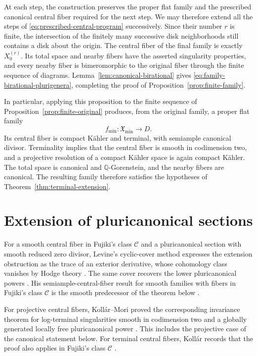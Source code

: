 \documentclass[11pt,a4paper]{article}
\theoremstyle{definition}\newtheorem{definition}[theorem]{Definition}
\theoremstyle{remark}\newtheorem*{remark}{Remark}
\newcommand{\Q}{\mathbb Q}\newcommand{\C}{\mathbb C}
\begin{document}
At each step, the construction preserves the proper flat family
and the prescribed canonical central fiber required for the next
step. We may therefore extend all the steps of
\eqref{eq:prescribed-central-program} successively. Since their
number $r$ is finite, the intersection of the finitely many
successive disk neighborhoods still contains a disk about the
origin. The central fiber of the final family is exactly
$X_0^{(r)}$. Its total space and nearby fibers have the asserted
singularity properties, and every nearby fiber is bimeromorphic
to the original fiber through the finite sequence of diagrams.
Lemma~\ref{lem:canonical-birational} gives
\eqref{eq:family-birational-plurigenera}, completing the proof of
Proposition~\ref{prop:finite-family}.

In particular, applying this proposition to the finite sequence
of Proposition~\ref{prop:finite-original} produces, from the
original family, a proper flat family
\begin{equation}\label{eq:terminal-family-output}
 f_{\min}:\mathfrak X_{\min}\longrightarrow D.
\end{equation}
Its central fiber is compact Kähler and terminal, with semiample
canonical divisor. Terminality implies
that the central fiber is smooth in codimension two, and a
projective resolution of a compact Kähler space is again compact
Kähler. The total space is canonical and $\Q$-Gorenstein, and
the nearby fibers are canonical. The resulting family therefore
satisfies the hypotheses of Theorem~\ref{thm:terminal-extension}.

\section{Extension of pluricanonical sections}\label{sec:terminal-extension}

For a smooth central fiber in Fujiki's class $\mathcal C$ and a
pluricanonical section with smooth reduced zero divisor, Levine's
cyclic-cover method expresses the extension obstruction as the trace
of an exterior derivative, whose
cohomology class vanishes by Hodge theory
\cite[Proposition~1.6]{Levine1983}. The same cover recovers the lower
pluricanonical powers \cite[Corollary~1.8]{Levine1983}.
His semiample-central-fiber result for smooth families with fibers in
Fujiki's class $\mathcal C$ is the smooth predecessor of the theorem
below \cite[Corollary~1.10]{Levine1983}.

For projective central fibers, Kollár--Mori proved the corresponding
invariance theorem for log-terminal singularities smooth in
codimension two and a globally generated locally free pluricanonical power
\cite[Theorem~12.5.5]{KM1992}.
This includes the projective case of the canonical statement below.
For terminal central fibers, Kollár records that the proof also applies
in Fujiki's class $\mathcal C$
\cite[comments following Conjecture~17]{Kollar2021}.
\end{document}
